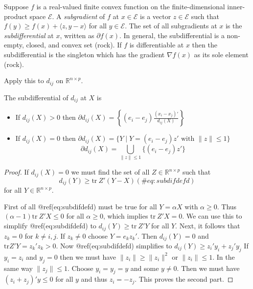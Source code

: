 \documentclass[
  12pt,
  letterpaper,
  DIV=11,
  numbers=noendperiod]{scrreprt}
\theoremstyle{remark}
\begin{document}
Suppose \(f\) is a real-valued finite convex function on the
finite-dimensional inner-product space \(\mathcal{E}\). A
\emph{subgradient} of \(f\) at \(x\in\mathcal{E}\) is a vector
\(z\in\mathcal{E}\) such that \(f(y)\geq f(x)+\langle z,y-x\rangle\) for
all \(y\in\mathcal{E}\). The set of all subgradients at \(x\) is the
\emph{subdifferential} at \(x\), written as \(\partial f(x)\). In
general, the subdifferential is a non-empty, closed, and convex set
(rock). If \(f\) is differentiable at \(x\) then the subdifferential is
the singleton which has the gradient \(\nabla f(x)\) as its sole element
(rock).

Apply this to \(d_{ij}\) on \(\mathbb{R}^{n\times p}\).

\label{subdifd}
The subdifferential of \(d_{ij}\) at \(X\) is

\begin{itemize}
\item
  If \(d_{ij}(X)>0\) then
  \(\partial d_{ij}(X)=\left\{(e_i-e_j)\frac{(x_i-x_j)'}{d_{ij}(X)}\right\}\)
\item
  If \(d_{ij}(X)=0\) then
  \(\partial d_{ij}(X)=\{Y\mid Y=(e_i-e_j)z' \text{ with } \|z\|\leq 1\}\)
  \[\partial d_{ij}(X)=\bigcup_{\|z\|\leq 1}\{(e_i-e_j)z'\}\]
\end{itemize}

\begin{proof}
If \(d_{ij}(X)=0\) we must find the set of all
\(Z\in\mathbb{R}^{n\times p}\) such that \begin{equation}
d_{ij}(Y)\geq\text{tr}\ Z'(Y-X)
(\#eq:subdifdefd)
\end{equation} for all \(Y\in\mathbb{R}^{n\times p}\).

First of all @ref(eq:subdifdefd) must be true for all \(Y=\alpha X\)
with \(\alpha\geq 0\). Thus \((\alpha-1)\text{tr}\ Z'X\leq 0\) for all
\(\alpha\geq 0\), which implies \(\text{tr}\ Z'X=0\). We can use this to
simplify @ref(eq:subdifdefd) to \(d_{ij}(Y)\geq\text{tr}\ Z'Y\) for all
\(Y\). Next, it follows that \(z_k=0\) for \(k\not= i,j\). If
\(z_k\not= 0\) choose \(Y=e_kz_k'\). Then \(d_{ij}(Y)=0\) and
\(\text{tr} Z'Y=z_k'z_k>0\). Now @ref(eq:subdifdefd) simplifies to
\(d_{ij}(Y)\geq z_i'y_i+z_j'y_j\) If \(y_i=z_i\) and \(y_j=0\) then we
must have \(\|z_i\|\geq\|z_i\|^2\) or \(\|z_i\|\leq 1\). In the same way
\(\|z_j\|\leq 1\). Choose \(y_i=y_j=y\) and some \(y\not= 0\). Then we
must have \((z_i+z_j)'y\leq 0\) for all \(y\) and thus \(z_i=-z_j\).
This proves the second part.
\end{proof}
\end{document}
